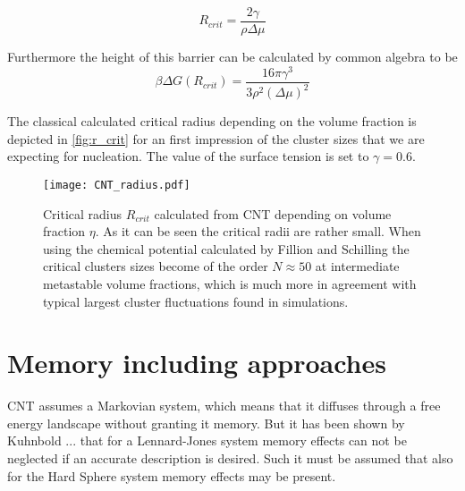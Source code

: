 \begin{equation}
\label{eqn:r_crit}
R_{crit} = \frac{2 \gamma}{\rho \Delta \mu }
\end{equation}

Furthermore the height of this barrier can be calculated by common algebra to be 
\begin{equation}
\beta \Delta G (R_{crit}) = \frac{16 \pi \gamma^3}{3 \rho^2 (\Delta \mu )^2}
\end{equation}

The classical calculated critical radius depending on the volume fraction is depicted in \autoref{fig:r_crit} for an first impression of the cluster sizes that we are expecting for nucleation. The value of the surface tension is set to $\gamma = 0.6$.  
\begin{figure}[h]
\centering
\texttt{[image: CNT\_radius.pdf]}
\caption{Critical radius $R_{crit}$ calculated from CNT depending on volume fraction $\eta$. As it can be seen the critical radii are rather small. When using the chemical potential calculated by Fillion and Schilling the critical clusters sizes become of the order $N \approx 50$ at intermediate metastable volume fractions, which is much more in agreement with typical largest cluster fluctuations found in simulations. }
\label{fig:r_crit}
\end{figure}





\section{Memory including approaches}
\label{sec:memory_approach}
CNT assumes a Markovian system, which means that it diffuses through a free energy landscape without granting it memory. But it has been shown by Kuhnbold ...  that for a Lennard-Jones system memory effects can not be neglected if an accurate  description is desired. Such it must be assumed that also for the Hard Sphere system memory effects may be present.\\


